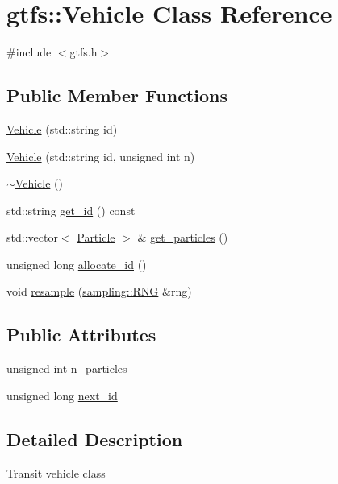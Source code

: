 \hypertarget{classgtfs_1_1Vehicle}{}\section{gtfs\+:\+:Vehicle Class Reference}
\label{classgtfs_1_1Vehicle}


{\ttfamily \#include $<$gtfs.\+h$>$}

\subsection*{Public Member Functions}
\begin{DoxyCompactItemize}
\item 
\hyperlink{classgtfs_1_1Vehicle_ac3f8111a611378f5f8b29f7465e48919}{Vehicle} (std\+::string id)
\item 
\hyperlink{classgtfs_1_1Vehicle_adf892e71483b7f9005846599fd0308e6}{Vehicle} (std\+::string id, unsigned int n)
\item 
\hyperlink{classgtfs_1_1Vehicle_a08c7450dd0df9406f78b30be044d27d8}{$\sim$\+Vehicle} ()
\item 
std\+::string \hyperlink{classgtfs_1_1Vehicle_a6b388986c9ed4af1eb86f13a3d2de8e0}{get\+\_\+id} () const
\item 
std\+::vector$<$ \hyperlink{classgtfs_1_1Particle}{Particle} $>$ \& \hyperlink{classgtfs_1_1Vehicle_a7b12b079c68880f00f532ca25858c368}{get\+\_\+particles} ()
\item 
unsigned long \hyperlink{classgtfs_1_1Vehicle_aa9087e973a9821f384ec47f51bdcedc7}{allocate\+\_\+id} ()
\item 
void \hyperlink{classgtfs_1_1Vehicle_a8367fc70a64b7e596422f880dbff1193}{resample} (\hyperlink{classsampling_1_1RNG}{sampling\+::\+R\+NG} \&rng)
\end{DoxyCompactItemize}
\subsection*{Public Attributes}
\begin{DoxyCompactItemize}
\item 
unsigned int \hyperlink{classgtfs_1_1Vehicle_aa21babc8423abf92bbdf5e0748444f44}{n\+\_\+particles}
\item 
unsigned long \hyperlink{classgtfs_1_1Vehicle_aab535dd9953f9650e2adc351965779b1}{next\+\_\+id}
\end{DoxyCompactItemize}


\subsection{Detailed Description}
Transit vehicle class

